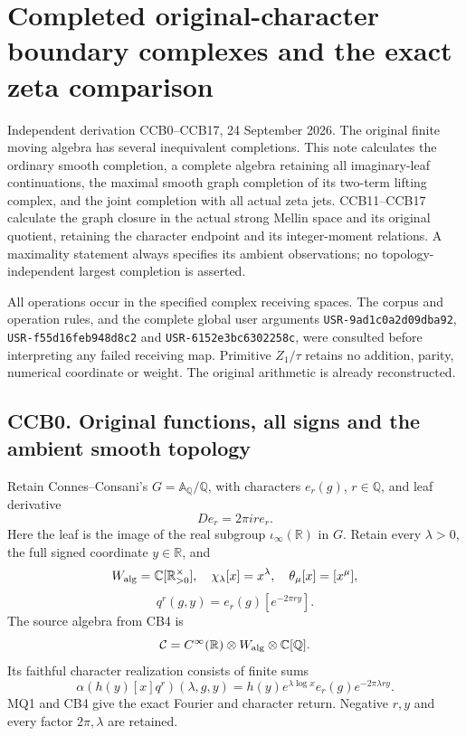 \section{Completed original-character boundary complexes and the exact
zeta
comparison}\label{completed-original-character-boundary-complexes-and-the-exact-zeta-comparison}

Independent derivation CCB0--CCB17, 24 September 2026. The original
finite moving algebra has several inequivalent completions. This note
calculates the ordinary smooth completion, a complete algebra retaining
all imaginary-leaf continuations, the maximal smooth graph completion of
its two-term lifting complex, and the joint completion with all actual
zeta jets. CCB11--CCB17 calculate the graph closure in the actual strong
Mellin space and its original quotient, retaining the character endpoint
and its integer-moment relations. A maximality statement always
specifies its ambient observations; no topology-independent largest
completion is asserted.

All operations occur in the specified complex receiving spaces. The
corpus and operation rules, and the complete global user arguments
\nolinkurl{USR-9ad1c0a2d09dba92}, \nolinkurl{USR-f55d16feb948d8c2} and \nolinkurl{USR-6152e3bc6302258c},
were consulted before interpreting any failed receiving map. Primitive
\(Z_1/\tau\) retains no addition, parity, numerical coordinate or
weight. The original arithmetic is already reconstructed.

\subsection{CCB0. Original functions, all signs and the ambient smooth
topology}\label{ccb0.-original-functions-all-signs-and-the-ambient-smooth-topology}

Retain Connes--Consani's \(G=\mathbb A_{\mathbb Q}/\mathbb Q\), with
characters \(e_r(g)\), \(r\in\mathbb Q\), and leaf derivative \[
D e_r=2\pi i r e_r.
\] Here the leaf is the image of the real subgroup
\(\iota_\infty(\mathbb R)\) in \(G\). Retain every \(\lambda>0\), the
full signed coordinate \(y\in\mathbb R\), and \[
W_{\rm alg}=\mathbb C[\mathbb R_{>0}^{\times}],
\quad\chi_\lambda[x]=x^\lambda,\quad\theta_\mu[x]=[x^\mu],
\] \[
q^r(g,y)=e_r(g)[e^{-2\pi ry}].
\] The source algebra from CB4 is \[
\mathcal C=C^\infty(\mathbb R)\otimes W_{\rm alg}\otimes\mathbb C[\mathbb Q].
\] Its faithful character realization consists of finite sums \[
\alpha(h(y)[x]q^r)(\lambda,g,y)
=h(y)e^{\lambda\log x}e_r(g)e^{-2\pi\lambda ry}.
\tag{CCB0.1}
\] MQ1 and CB4 give the exact Fourier and character return. Negative
\(r,y\) and every factor \(2\pi,\lambda\) are retained.

